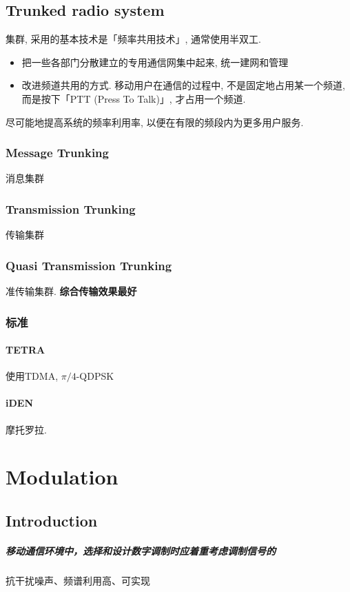 \documentclass[a4paper]{report}
\begin{document}
\section{Trunked radio system}
\label{sec:truck}
集群, 采用的基本技术是「频率共用技术」, 通常使用半双工. 

\begin{itemize}
	\item 把一些各部门分散建立的专用通信网集中起来, 统一建网和管理
	\item 改进频道共用的方式. 移动用户在通信的过程中, 不是固定地占用某一个频道, 而是按下「PTT (Press To Talk)」, 才占用一个频道. 
\end{itemize}

尽可能地提高系统的频率利用率, 以便在有限的频段内为更多用户服务. 
\subsection{Message Trunking}
消息集群
\subsection{Transmission Trunking}
传输集群
\subsection{Quasi Transmission Trunking}
准传输集群. \textbf{综合传输效果最好}
\subsection{标准}
\subsubsection{TETRA}
使用TDMA, $\pi/4$-QDPSK
\subsubsection{iDEN}
摩托罗拉. 



\chapter{Modulation}
\section{Introduction}
\paragraph{移动通信环境中，选择和设计数字调制时应着重考虑调制信号的}
抗干扰噪声、频谱利用高、可实现
\end{document}
